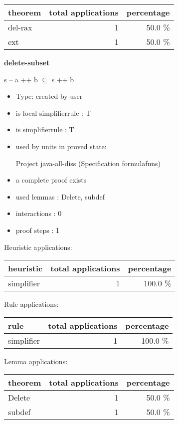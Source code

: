 \documentclass[a4paper]{article}
\begin{document}
\begin{supertabular}{l|r|r}
theorem	        & total applications & percentage \\ \hline
del-rax & 1 & 50.0 \% \\
ext & 1 & 50.0 \% \\

\end{supertabular}
\pagebreak

{\LARGE\bf delete-subset}\label{lemma-delete-subset}

\medskip

 \Fol s -- a ++ b $\subseteq$ s ++ b

\begin{itemize}

\item Type: created by user

\item is local simplifierrule : T
\item is simplifierrule : T
\item used by units in proved state:

Project java-all-diss (Specification formulafuns)
\item       a complete proof exists
\item       used lemmas  : Delete, subdef
\item       interactions : 0
\item       proof steps  : 1
\end{itemize}

\medskip


Heuristic applications:

\begin{supertabular}{l|r|r}
heuristic	& total applications & percentage \\ \hline
simplifier & 1 & 100.0 \% \\

\end{supertabular}

Rule applications:

\begin{supertabular}{l|r|r}
rule	        & total applications & percentage \\ \hline
simplifier & 1 & 100.0 \% \\

\end{supertabular}

Lemma applications:

\begin{supertabular}{l|r|r}
theorem	        & total applications & percentage \\ \hline
Delete & 1 & 50.0 \% \\
subdef & 1 & 50.0 \% \\

\end{supertabular}
\pagebreak
\end{document}
